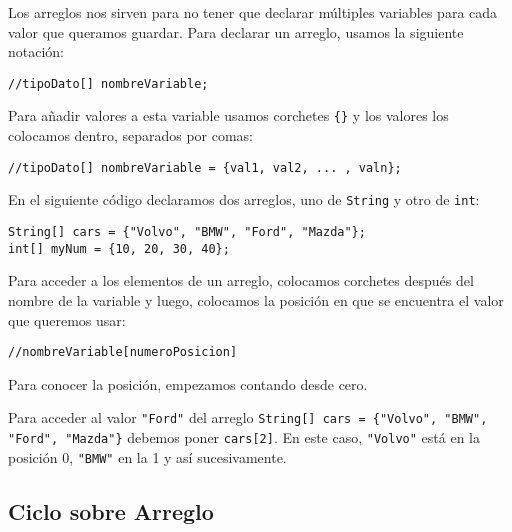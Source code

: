 \documentclass[12pt]{article}
\theoremstyle{largebreak}
\begin{document}
    Los arreglos nos sirven para no tener que declarar múltiples variables para cada valor que queramos guardar. Para declarar un arreglo, usamos la siguiente notación:
    
    \begin{lstlisting}[caption={Declaración de un arreglo de algún tipo de dato.},label=DescriptiveLabel]
//tipoDato[] nombreVariable;
    \end{lstlisting}
    Para añadir valores a esta variable usamos corchetes \lstinline|{}| y los valores los colocamos dentro, separados por comas:
\begin{lstlisting}[caption={Declaración de un arreglo con valores dados.},label=DescriptiveLabel]
//tipoDato[] nombreVariable = {val1, val2, ... , valn};
    \end{lstlisting}

    \begin{exa}
        En el siguiente código declaramos dos arreglos, uno de \lstinline|String| y otro de \lstinline|int|:
        \begin{lstlisting}[caption={Ejemplo Arreglos.},label=DescriptiveLabel]
String[] cars = {"Volvo", "BMW", "Ford", "Mazda"};
int[] myNum = {10, 20, 30, 40};
        \end{lstlisting}
    \end{exa}

    Para acceder a los elementos de un arreglo, colocamos corchetes después del nombre de la variable y luego, colocamos la posición en que se encuentra el valor que queremos usar:
    \begin{lstlisting}[caption={Acceder a variable arreglo.},label=DescriptiveLabel]
//nombreVariable[numeroPosicion]
    \end{lstlisting}
    Para conocer la posición, empezamos contando desde cero.

    \begin{exa}
        Para acceder al valor \lstinline|"Ford"| del arreglo \lstinline|String[] cars = {"Volvo", "BMW", "Ford", "Mazda"}| debemos poner \lstinline|cars[2]|. En este caso, \lstinline|"Volvo"| está en la posición 0, \lstinline|"BMW"| en la 1 y así sucesivamente.
    \end{exa}

    \subsection{Ciclo sobre Arreglo}
\end{document}
